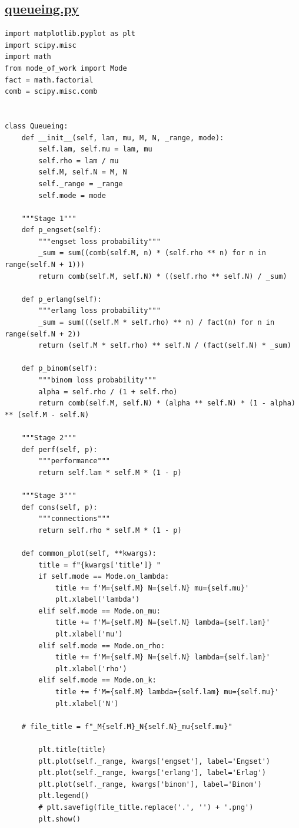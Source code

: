 \documentclass[12pt]{article}
\newcommand\purl[1]{\protect\url{#1}} %
\let\Oldsubsection\subsection
\renewcommand{\subsection}{\FloatBarrier\Oldsubsection}
\begin{document}
\subsection{\purl{queueing.py}}
\begin{lstlisting}
import matplotlib.pyplot as plt
import scipy.misc
import math
from mode_of_work import Mode
fact = math.factorial
comb = scipy.misc.comb


class Queueing:
    def __init__(self, lam, mu, M, N, _range, mode):
        self.lam, self.mu = lam, mu
        self.rho = lam / mu
        self.M, self.N = M, N
        self._range = _range
        self.mode = mode

    """Stage 1"""
    def p_engset(self):
        """engset loss probability"""
        _sum = sum((comb(self.M, n) * (self.rho ** n) for n in range(self.N + 1)))
        return comb(self.M, self.N) * ((self.rho ** self.N) / _sum)

    def p_erlang(self):
        """erlang loss probability"""
        _sum = sum(((self.M * self.rho) ** n) / fact(n) for n in range(self.N + 2))
        return (self.M * self.rho) ** self.N / (fact(self.N) * _sum)

    def p_binom(self):
        """binom loss probability"""
        alpha = self.rho / (1 + self.rho)
        return comb(self.M, self.N) * (alpha ** self.N) * (1 - alpha) ** (self.M - self.N)

    """Stage 2"""
    def perf(self, p):
        """performance"""
        return self.lam * self.M * (1 - p)

    """Stage 3"""
    def cons(self, p):
        """connections"""
        return self.rho * self.M * (1 - p)

    def common_plot(self, **kwargs):
        title = f"{kwargs['title']} "
        if self.mode == Mode.on_lambda:
            title += f'M={self.M} N={self.N} mu={self.mu}'
            plt.xlabel('lambda')
        elif self.mode == Mode.on_mu:
            title += f'M={self.M} N={self.N} lambda={self.lam}'
            plt.xlabel('mu')
        elif self.mode == Mode.on_rho:
            title += f'M={self.M} N={self.N} lambda={self.lam}'
            plt.xlabel('rho')
        elif self.mode == Mode.on_k:
            title += f'M={self.M} lambda={self.lam} mu={self.mu}'
            plt.xlabel('N')

    # file_title = f"_M{self.M}_N{self.N}_mu{self.mu}"

        plt.title(title)
        plt.plot(self._range, kwargs['engset'], label='Engset')
        plt.plot(self._range, kwargs['erlang'], label='Erlag')
        plt.plot(self._range, kwargs['binom'], label='Binom')
        plt.legend()
        # plt.savefig(file_title.replace('.', '') + '.png')
        plt.show()
\end{lstlisting}
\end{document}
